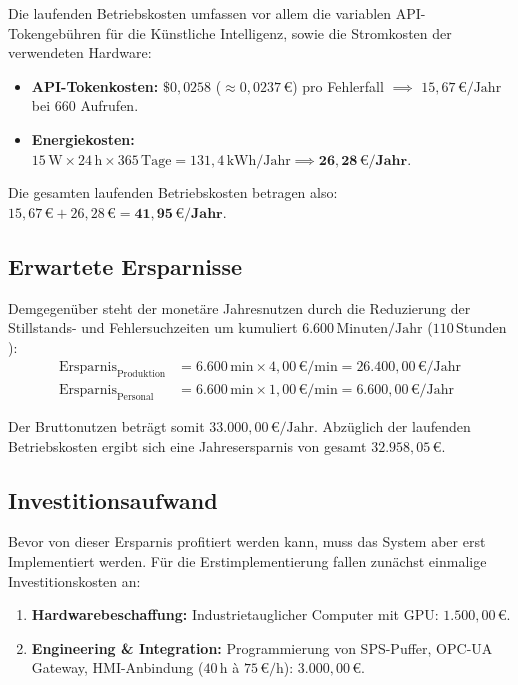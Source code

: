 Die laufenden Betriebskosten umfassen vor allem die variablen API-Tokengebühren für die Künstliche Intelligenz, sowie die Stromkosten der verwendeten Hardware:

\begin{itemize}
    \item \textbf{API-Tokenkosten:} $\$0{,}0258$ ($\approx 0{,}0237\,\text{€}$) pro Fehlerfall $\implies$ \textbf{$15{,}67\,\text{€/Jahr}$} bei 660 Aufrufen.
    \item \textbf{Energiekosten:} $15\,\text{W} \times 24\,\text{h} \times 365\,\text{Tage} = 131{,}4\,\text{kWh/Jahr} \implies \mathbf{26{,}28\,\text{€/Jahr}}$.
\end{itemize}

Die gesamten laufenden Betriebskosten betragen also: $15{,}67\,\text{€} + 26{,}28\,\text{€} = \mathbf{41{,}95\,\text{€/Jahr}}$.


\subsection{Erwartete Ersparnisse}

Demgegenüber steht der monetäre Jahresnutzen durch die Reduzierung der Stillstands- und Fehlersuchzeiten um kumuliert $6.600\,\text{Minuten/Jahr}$ ($110\,\text{Stunden}$):
\begin{align}
    \text{Ersparnis}_{\text{Produktion}} &= 6.600\,\text{min} \times 4{,}00\,\text{€/min} = 26.400{,}00\,\text{€/Jahr} \\
    \text{Ersparnis}_{\text{Personal}} &= 6.600\,\text{min} \times 1{,}00\,\text{€/min} = 6.600{,}00\,\text{€/Jahr}
\end{align}

Der Bruttonutzen beträgt somit $33.000{,}00\,\text{€/Jahr}$. Abzüglich der laufenden Betriebskosten ergibt sich eine Jahresersparnis von gesamt  $32.958{,}05\,\text{€}$.

\subsection{Investitionsaufwand}

Bevor von dieser Ersparnis profitiert werden kann, muss das System aber erst Implementiert werden. Für die Erstimplementierung fallen zunächst einmalige Investitionskosten an:

\begin{enumerate}
    \item \textbf{Hardwarebeschaffung:} Industrietauglicher Computer mit GPU: $1.500{,}00\,\text{€}$.
    \item \textbf{Engineering \& Integration:} Programmierung von SPS-Puffer, OPC-UA Gateway, HMI-Anbindung ($40\,\text{h}$ à $75\,\text{€/h}$): $3.000{,}00\,\text{€}$.
\end{enumerate}

